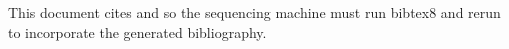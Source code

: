 \documentclass[11pt]{article}
\begin{document}
This document cites \cite{knuth1984} and \cite{lamport1994} so the sequencing
machine must run bibtex8 and rerun to incorporate the generated bibliography.



\end{document}
